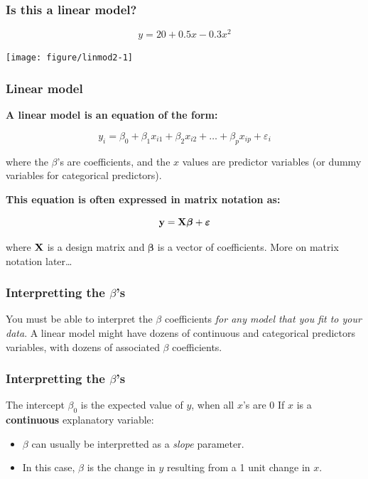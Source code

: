 \documentclass[color=usenames,dvipsnames]{beamer}\usepackage[]{graphicx}\usepackage[]{color}
\begin{document}
\begin{frame}[fragile]
  \frametitle{Is this a linear model?}
\[
y = 20 + 0.5 x - 0.3 x^2
\]

\begin{center}
  \texttt{[image: figure/linmod2-1]}
\end{center}
\end{frame}





\begin{frame}
  \frametitle{Linear model}
{\bf A linear model is an equation of the form:}

\[
y_i = \beta_0 + \beta_1 x_{i1} + \beta_2 x_{i2} + \ldots + \beta_p x_{ip} + \varepsilon_i
\]

where the $\beta$'s are coefficients, and the $x$ values are predictor
variables (or dummy variables for categorical predictors).
\pause

\vspace{0.5cm}

{\bf This equation is often expressed in matrix notation as:}

\[
{\bf y} = {\bf X} {\bm{\beta}} + {\bm \varepsilon}
\]

where $\bf X$ is a \alert{design matrix} and $\bm{\beta}$ is a
vector of coefficients. \pause More on matrix notation later\dots
\end{frame}






\begin{frame}
  \frametitle{Interpretting the $\beta$'s}
You must be able to interpret the $\beta$
coefficients {\it for any model that you fit to your data}.
\pause
\vfill
A linear model might have dozens of continuous and categorical
predictors variables, with dozens of associated $\beta$ coefficients.
\end{frame}


\begin{frame}
  \frametitle{Interpretting the $\beta$'s}%
  The intercept $\beta_0$ is the expected value of $y$, when all $x$'s are 0
  \pause
  \vfill
  If $x$ is a {\bf continuous} explanatory variable: %
  \begin{itemize}
    \item $\beta$ can usually be interpretted as a \textit{slope}
      parameter.
    \item In this case, $\beta$ is the
      change in $y$ resulting from a 1 unit change in $x$.
  \end{itemize}
\end{frame}
\end{document}
